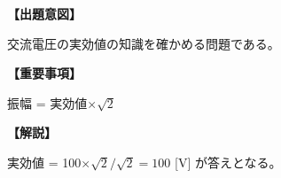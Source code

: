 \noindent \textbf{【出題意図】}

\noindent 交流電圧の実効値の知識を確かめる問題である。

\vspace{1em}
\noindent \textbf{【重要事項】}

\medskip
振幅 = 実効値$\times \sqrt{2}$

\vspace{1em}
\noindent \textbf{【解説】}

\noindent 実効値 = 100$\times \sqrt{2} / \sqrt{2} = 100$ [V] が答えとなる。

